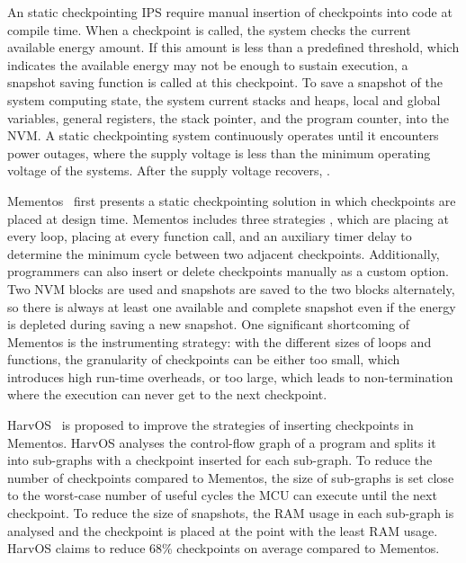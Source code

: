An static checkpointing IPS require manual insertion of checkpoints into code at compile time. 
When a checkpoint is called, the system checks the current available energy amount. 
If this amount is less than a predefined threshold, which indicates the available energy may not be enough to sustain execution, a snapshot saving function is called at this checkpoint. 
To save a snapshot of the system computing state, the system  current stacks and heaps, local and global variables, general registers, the stack pointer, and the program counter, into the NVM. 
A static checkpointing system continuously operates until it encounters power outages, where the supply voltage is less than the minimum operating voltage of the systems. 
After the supply voltage recovers, . 

Mementos~\cite{ransford2012mementos} first presents a static checkpointing solution in which checkpoints are placed at design time. 
Mementos includes three strategies , which are placing at every loop, placing at every function call, and an auxiliary timer delay to determine the minimum cycle between two adjacent checkpoints. 
Additionally, programmers can also insert or delete checkpoints manually as a custom option. 
Two NVM blocks are used and snapshots are saved to the two blocks alternately, so there is always at least one available and complete snapshot even if the energy is depleted during saving a new snapshot. 
One significant shortcoming of Mementos is the instrumenting strategy: with the different sizes of loops and functions, the granularity of checkpoints can be either too small, which introduces high run-time overheads, or too large, which leads to non-termination where the execution can never get to the next checkpoint. 

HarvOS~\cite{bhatti2017harvos} is proposed to improve the strategies of inserting checkpoints in Mementos. 
HarvOS analyses the control-flow graph of a program and splits it into sub-graphs with a checkpoint inserted for each sub-graph. 
To reduce the number of checkpoints compared to Mementos, the size of sub-graphs is set close to the worst-case number of useful cycles the MCU can execute until the next checkpoint. 
To reduce the size of snapshots, the RAM usage in each sub-graph is analysed and the checkpoint is placed at the point with the least RAM usage. HarvOS claims to reduce 68\% checkpoints on average compared to Mementos.

